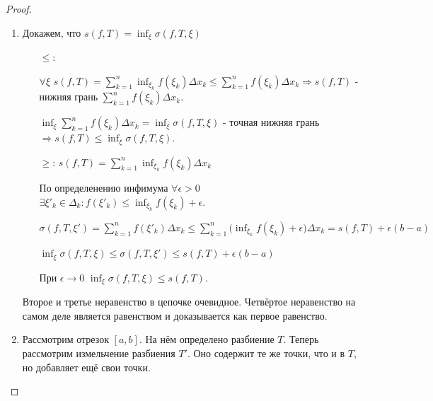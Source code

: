     \begin{proof}
    	\begin{enumerate}
    		\item Докажем, что $\displaystyle s(f, T) = \inf_{\xi}{\sigma(f, T, \xi)}$
    		\begin{enumerate}
    			\item[$\leqslant$:] 
    			
    			$\forall \xi$ $\displaystyle s(f, T) = \sum_{k = 1}^n \inf_{\xi_k}{f(\xi_k) \Delta x_k} \leqslant \sum_{k = 1}^n f(\xi_k) \Delta x_k \Rightarrow s(f, T)$ - нижняя грань $\displaystyle \sum_{k = 1}^n f(\xi_k) \Delta x_k$.
    			
    			$\displaystyle \inf_{\xi}{\sum_{k = 1}^n f(\xi_k) \Delta x_k} = \inf_{\xi}{\sigma(f, T, \xi)}$ - точная нижняя грань $\Rightarrow \displaystyle s(f, T) \leqslant \inf_{\xi}{\sigma(f, T, \xi)}$.
    			
    			\item[$\geqslant$:] $\displaystyle s(f, T) = \sum_{k = 1}^n \inf_{\xi_k}{f(\xi_k) \Delta x_k}$
    			
    			По определенению инфимума $\forall \epsilon > 0$ $\displaystyle \exists \xi'_k \in \Delta_k : f(\xi'_k) \leqslant  \inf_{\xi_k}{f(\xi_k)} + \epsilon.$
    			
    			$\displaystyle \sigma(f, T, \xi') = \sum_{k = 1}^n f(\xi'_k) \Delta x_k \leqslant \sum_{k = 1}^n \bigg(\inf_{\xi_k}{f(\xi_k)} + \epsilon \bigg) \Delta x_k = s(f, T) + \epsilon(b - a)$
    			
    			$\displaystyle \inf_{\xi}{\sigma(f, T, \xi)} \leqslant \sigma(f, T, \xi') \leqslant s(f, T) + \epsilon(b - a)$
    			
    			При $\epsilon \to 0$ $\displaystyle \inf_{\xi}{\sigma{(f, T, \xi)}} \leqslant s(f, T)$.
    		\end{enumerate}
    		Второе и третье неравенство в цепочке очевидное.
    		Четвёртое неравенство на самом деле является равенством и доказывается как первое равенство.
    		\item Рассмотрим отрезок $[a, b]$. На нём определено разбиение $T$. Теперь рассмотрим измельчение разбиения $T'$. Оно содержит те же точки, что и в $T$, но добавляет ещё свои точки.
    		

\end{enumerate}
\end{proof}
